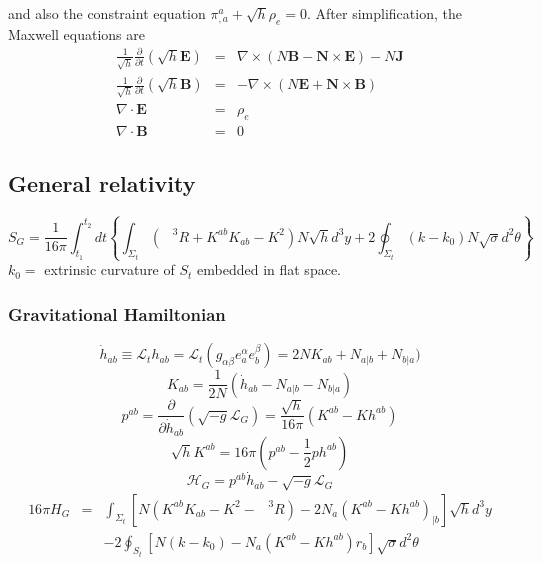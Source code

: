 \begin{example}
and also the constraint equation $\pi^a_{,a} + \sqrt{h}\rho_e = 0$.
After simplification, the Maxwell equations are
\begin{eqnarray}
\frac{1}{\sqrt{h}}\frac{\partial}{\partial t}(\sqrt{h} \bm{E}) &=& \nabla \times (N \bm{B} - \bm{N} \times \bm{E}) - N \bm{J} \nonumber \\
\frac{1}{\sqrt{h}}\frac{\partial}{\partial t}(\sqrt{h} \bm{B}) &=& -\nabla \times (N \bm{E} + \bm{N} \times \bm{B}) \nonumber \\
\nabla \cdot \bm{E} &=& \rho_e \nonumber \\
\nabla \cdot \bm{B} &=& 0 \nonumber
\end{eqnarray}
\end{example}


\subsection{General relativity}
\[S_G = \frac{1}{16 \pi} \int_{t_1}^{t_2} dt \left\{ \int_{\Sigma_t} \left(\phantom{R}^3R + K^{ab}K_{ab} -K^2 \right) N \sqrt{h} d^3 y + 2\oint_{\Sigma_t}(k-k_0)N \sqrt{\sigma}d^2 \theta \right\} \]
$k_0 =$ extrinsic curvature of $S_t$ embedded in flat space. 

\subsubsection{Gravitational Hamiltonian}
\[\dot{h}_{ab} \equiv \mathcal{L}_t h_{ab} = \mathcal{L}_t (g_{\alpha \beta} e_a^{\alpha} e_b^{\beta}) =  2NK_{ab} + N_{a|b} + N_{b|a})\]
\[K_{ab} = \frac{1}{2N} (\dot{h}_{ab} - N_{a|b} - N_{b|a})\]
\[p^{ab} = \frac{\partial}{\partial \dot{h}_{ab}} (\sqrt{-g} \mathcal{L}_G) = \frac{\sqrt{h}}{16\pi} (K^{ab} - K h^{ab})\]
\[\sqrt{h}K^{ab} = 16\pi (p^{ab} - \frac{1}{2}ph^{ab})\]
\[\mathcal{H}_G = p^{ab}\dot{h}_{ab} - \sqrt{-g} \mathcal{L}_G\]
\begin{eqnarray}
16\pi H_G &=& \int_{\Sigma_t} \left[ N(K^{ab}K_{ab} - K^2 - \phantom{R}^3R) - 2N_a(K^{ab} - Kh^{ab})_{|b} \right] \sqrt{h} d^3 y 
\nonumber \\
&\phantom{=}& -2\oint_{S_t} \left[ N(k-k_0) - N_a(K^{ab}-Kh^{ab})r_b \right] \sqrt{\sigma} d^2 \theta \nonumber
\end{eqnarray}

